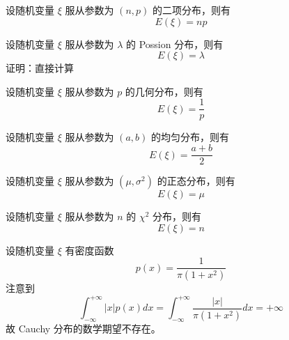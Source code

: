 \documentclass[12pt,a4paper]{amsart}
\begin{document}
\begin{proposition}[二项分布的数学期望]
    设随机变量 $\xi$ 服从参数为 $(n, p)$ 的二项分布，则有
    \begin{equation}
        E(\xi) = np
    \end{equation}
\end{proposition}

\begin{proposition}
    设随机变量 $\xi$ 服从参数为 $\lambda$ 的 Possion 分布，则有
    \begin{equation}
        E(\xi) = \lambda
    \end{equation}
    证明：直接计算
\end{proposition}

\begin{proposition}[几何分布的数学期望]
    设随机变量 $\xi$ 服从参数为 $p$ 的几何分布，则有
    \begin{equation}
        E(\xi) = \frac{1}{p}
    \end{equation}
\end{proposition}

\begin{proposition}[均匀分布的数学期望]
    设随机变量 $\xi$ 服从参数为 $(a, b)$ 的均匀分布，则有
    \begin{equation}
        E(\xi) = \frac{a + b}{2}
    \end{equation}
\end{proposition}

\begin{proposition}[正态分布的数学期望]
    设随机变量 $\xi$ 服从参数为 $(\mu, \sigma^2)$ 的正态分布，则有
    \begin{equation}
        E(\xi) = \mu
    \end{equation}
\end{proposition}

\begin{proposition}
    设随机变量 $\xi$ 服从参数为 $n$ 的 \( \chi^2 \) 分布，则有
    \begin{equation}
        E(\xi) = n
    \end{equation}
\end{proposition}

\begin{proposition}
    设随机变量 $\xi$ 有密度函数
    \begin{equation}
        p(x) = \frac{1}{\pi(1 + x^2)}
    \end{equation}
    注意到
    \begin{equation}
        \int_{-\infty}^{+\infty} |x| p(x) dx = \int_{-\infty}^{+\infty} \frac{|x|}{\pi(1 + x^2)} dx = +\infty
    \end{equation}
    故 Cauchy 分布的数学期望不存在。
\end{proposition}
\end{document}
